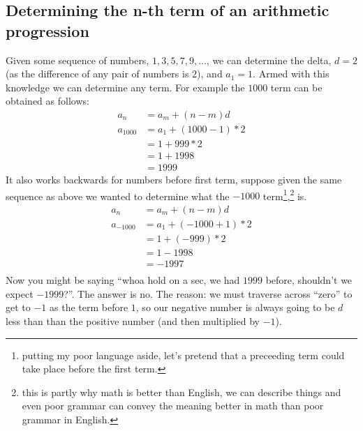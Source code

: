 \subsection{Determining the n-th term of an arithmetic progression}
\label{sec:nthTermOfAnArithmeticProgression}
Given some sequence of numbers, $1, 3, 5, 7, 9, \ldots$, we can determine the
delta, $d=2$ (as the difference of any pair of numbers is $2$), and $a_1 = 1$.
Armed with this knowledge we can determine any term. For example the
$1000$ term can be obtained as follows:
\begin{align}
  a_n &= a_m + (n-m)d \nonumber \\
  a_{1000} &= a_{1} + (1000-1)*2 \\
    &= 1 + 999*2 \\
    &= 1 + 1998 \\
    &= 1999
\end{align}
It also works backwards for numbers before first term, suppose given the same
sequence as above we wanted to determine what the $-1000$
term\footnote{putting my poor language aside, let's pretend that a preceeding
term could take place before the first term.},\tsup{,}\footnote{this is partly
why math is better than English, we can describe things and even poor grammar
can convey the meaning better in math than poor grammar in English.} is.
\begin{align}
  a_n &= a_m + (n-m)d \nonumber \\
  a_{-1000} &= a_{1} + (-1000+1)*2 \\
    &= 1 + (-999)*2 \\
    &= 1 -1998 \\
    &= -1997 \\
\end{align}
Now you might be saying ``whoa hold on a sec, we had $1999$ before, shouldn't we
expect $-1999$?''. The answer is no. The reason: we must traverse across
``zero'' to get to $-1$ as the term before $1$, so our negative number is always
going to be $d$ less than than the positive number (and then multiplied by
$-1$).
\newpage
